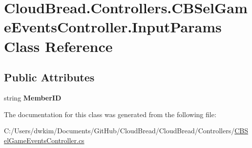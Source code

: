 \hypertarget{class_cloud_bread_1_1_controllers_1_1_c_b_sel_game_events_controller_1_1_input_params}{}\section{Cloud\+Bread.\+Controllers.\+C\+B\+Sel\+Game\+Events\+Controller.\+Input\+Params Class Reference}
\label{class_cloud_bread_1_1_controllers_1_1_c_b_sel_game_events_controller_1_1_input_params}
\subsection*{Public Attributes}
\begin{DoxyCompactItemize}
\item 
string {\bfseries Member\+ID}\hypertarget{class_cloud_bread_1_1_controllers_1_1_c_b_sel_game_events_controller_1_1_input_params_a124f039d1948f24381d448c0df327b8f}{}\label{class_cloud_bread_1_1_controllers_1_1_c_b_sel_game_events_controller_1_1_input_params_a124f039d1948f24381d448c0df327b8f}

\end{DoxyCompactItemize}


The documentation for this class was generated from the following file\+:\begin{DoxyCompactItemize}
\item 
C\+:/\+Users/dwkim/\+Documents/\+Git\+Hub/\+Cloud\+Bread/\+Cloud\+Bread/\+Controllers/\hyperlink{_c_b_sel_game_events_controller_8cs}{C\+B\+Sel\+Game\+Events\+Controller.\+cs}\end{DoxyCompactItemize}
